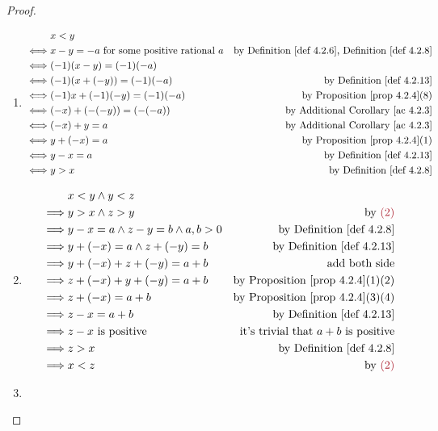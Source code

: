 \begin{proof}
\begin{enumerate}
    \item {}
        \begin{align*}
                 & x < y \\
            \iff & x - y = -a \text{\ for some positive rational \(a\)} & \text{by \DEF{4.2.6}, \DEF{4.2.8}} \\
            \iff & (-1)(x - y) = (-1)(-a) \\
            \iff & (-1)(x + (-y)) = (-1)(-a) & \text{by \DEF{4.2.13}} \\
            \iff & (-1)x + (-1)(-y) = (-1)(-a) & \text{by \PROP{4.2.4}(8)} \\
            \iff & (-x) + (-(-y)) = (-(-a)) & \text{by \AC{4.2.3}} \\
            \iff & (-x) + y = a & \text{by \AC{4.2.3}} \\
            \iff & y + (-x) = a & \text{by \PROP{4.2.4}(1)} \\
            \iff & y - x = a & \text{by \DEF{4.2.13}} \\
            \iff & y > x & \text{by \DEF{4.2.8}}
        \end{align*}
    \item {}
        \begin{align*}
                     & x < y \land y < z \\
            \implies & y > x \land z > y & \text{by \MAROON{(2)}} \\
            \implies & y - x = a \land z - y = b \land a, b > 0 & \text{by \DEF{4.2.8}} \\
            \implies & y + (-x) = a \land z + (-y) = b & \text{by \DEF{4.2.13}} \\
            \implies & y + (-x) + z + (-y) = a + b & \text{add both side} \\
            \implies & z + (-x) + y + (-y) = a + b & \text{by \PROP{4.2.4}(1)(2)} \\
            \implies & z + (-x) = a + b & \text{by \PROP{4.2.4}(3)(4)} \\
            \implies & z - x = a + b & \text{by \DEF{4.2.13}} \\
            \implies & z - x \text{\ is positive} & \text{it's trivial that \(a + b\) is positive} \\
            \implies & z > x & \text{by \DEF{4.2.8}} \\
            \implies & x < z & \text{by \MAROON{(2)}}
        \end{align*}
    \item {}

\end{enumerate}
\end{proof}
